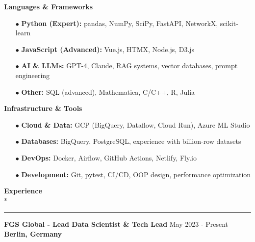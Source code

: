 \documentclass[11pt,a4paper]{article}
\newlength{\spacesm}    \setlength{\spacesm}{11pt}     %
\newlength{\spacexl}    \setlength{\spacexl}{38pt}     %
\newcommand{\bodytext}[1]{%
    {\fontsize{10pt}{14pt}\selectfont\color{charcoal} #1}%
}
\newcommand{\bodytextbold}[1]{%
    {\fontsize{10pt}{14pt}\selectfont\color{charcoal}\bfseries #1}%
}
\newcommand{\microtext}[1]{%
    {\fontsize{8pt}{11pt}\selectfont\color{mediumgray} #1}%
}
\newcommand{\sectiontitle}[1]{%
    \needspace{4\baselineskip}%
    \vspace{\spacexl}%
    {\fontsize{12pt}{14pt}\selectfont\color{navy}\bfseries #1}\\*%
    \vspace{1pt}%
    {\color{verdigris}\rule{20pt}{1pt}}%
    \vspace{0pt}%
}
\newcommand{\verdigrisbullet}{{\color{verdigris}$\bullet$}\space}
\newcommand{\jobduration}[1]{%
    {\fontspec{JetBrains Mono}\microtext{#1}}
}
\newcommand{\companyname}[1]{%
    {\color{darkgray}\bfseries #1}
}
\begin{document}
\setlength{\multicolsep}{0pt}
\begin{multicols}{2}
\raggedcolumns
\bodytextbold{Languages \& Frameworks}
\vspace{2pt}
\begin{itemize}[leftmargin=15pt,itemindent=0pt,labelwidth=10pt,labelsep=5pt,itemsep=1pt,parsep=0pt,topsep=0pt,partopsep=0pt]
    \item[\verdigrisbullet] \bodytext{\textbf{Python (Expert):} pandas, NumPy, SciPy, FastAPI, NetworkX, scikit-learn}
    \item[\verdigrisbullet] \bodytext{\textbf{JavaScript (Advanced):} Vue.js, HTMX, Node.js, D3.js}
    \item[\verdigrisbullet] \bodytext{\textbf{AI \& LLMs:} GPT-4, Claude, RAG systems, vector databases, prompt engineering}
    \item[\verdigrisbullet] \bodytext{\textbf{Other:} SQL (advanced), Mathematica, C/C++, R, Julia}
\end{itemize}

\columnbreak

\bodytextbold{Infrastructure \& Tools}
\vspace{2pt}
\begin{itemize}[leftmargin=15pt,itemindent=0pt,labelwidth=10pt,labelsep=5pt,itemsep=1pt,parsep=0pt,topsep=0pt,partopsep=0pt]
    \item[\verdigrisbullet] \bodytext{\textbf{Cloud \& Data:} GCP (BigQuery, Dataflow, Cloud Run), Azure ML Studio}
    \item[\verdigrisbullet] \bodytext{\textbf{Databases:} BigQuery, PostgreSQL, experience with billion-row datasets}
    \item[\verdigrisbullet] \bodytext{\textbf{DevOps:} Docker, Airflow, GitHub Actions, Netlify, Fly.io}
    \item[\verdigrisbullet] \bodytext{\textbf{Development:} Git, pytest, CI/CD, OOP design, performance optimization}
\end{itemize}
\end{multicols}

\sectiontitle{Experience}
\vspace{\spacesm}

\bodytext{\textbf{FGS Global - Lead Data Scientist \& Tech Lead}} \hfill \jobduration{May 2023 - Present}\\
\companyname{Berlin, Germany}
\end{document}
